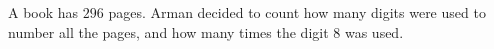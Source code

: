 A book has $296$ pages. Arman decided to count how many digits were used to number all the pages, and how many times the digit $8$ was used.
